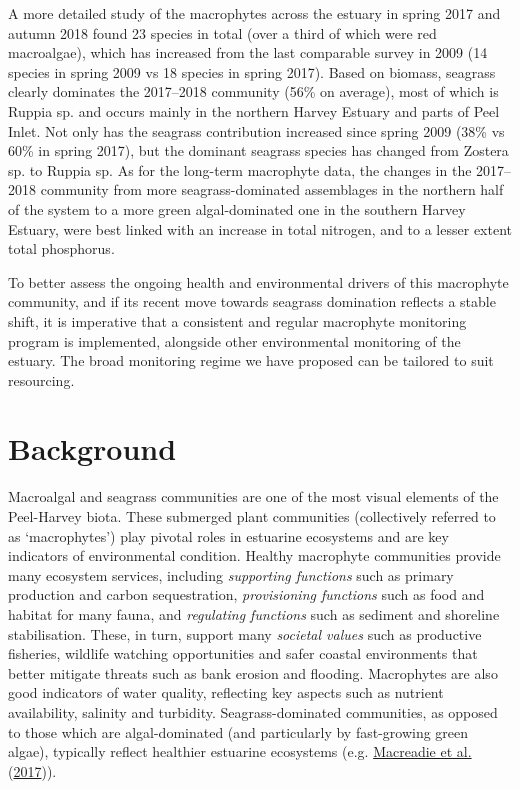 \documentclass[
]{book}
\begin{document}
A more detailed study of the macrophytes across the estuary in spring 2017 and autumn 2018 found 23 species in total (over a third of which were red macroalgae), which has increased from the last comparable survey in 2009 (14 species in spring 2009 vs 18 species in spring 2017). Based on biomass, seagrass clearly dominates the 2017--2018 community (56\% on average), most of which is Ruppia sp. and occurs mainly in the northern Harvey Estuary and parts of Peel Inlet. Not only has the seagrass contribution increased since spring 2009 (38\% vs 60\% in spring 2017), but the dominant seagrass species has changed from Zostera sp. to Ruppia sp. As for the long-term macrophyte data, the changes in the 2017--2018 community from more seagrass-dominated assemblages in the northern half of the system to a more green algal-dominated one in the southern Harvey Estuary, were best linked with an increase in total nitrogen, and to a lesser extent total phosphorus.

To better assess the ongoing health and environmental drivers of this macrophyte community, and if its recent move towards seagrass domination reflects a stable shift, it is imperative that a consistent and regular macrophyte monitoring program is implemented, alongside other environmental monitoring of the estuary. The broad monitoring regime we have proposed can be tailored to suit resourcing.

\hypertarget{background-2}{%
\section{Background}\label{background-2}}

Macroalgal and seagrass communities are one of the most visual elements of the Peel-Harvey biota. These submerged plant communities (collectively referred to as `macrophytes') play pivotal roles in estuarine ecosystems and are key indicators of environmental condition. Healthy macrophyte communities provide many ecosystem services, including \emph{supporting functions} such as primary production and carbon sequestration, \emph{provisioning functions} such as food and habitat for many fauna, and \emph{regulating functions} such as sediment and shoreline stabilisation. These, in turn, support many \emph{societal values} such as productive fisheries, wildlife watching opportunities and safer coastal environments that better mitigate threats such as bank erosion and flooding. Macrophytes are also good indicators of water quality, reflecting key aspects such as nutrient availability, salinity and turbidity. Seagrass-dominated communities, as opposed to those which are algal-dominated (and particularly by fast-growing green algae), typically reflect healthier estuarine ecosystems (e.g. \protect\hyperlink{ref-macreadie2017}{Macreadie et al.} (\protect\hyperlink{ref-macreadie2017}{2017})).
\end{document}
